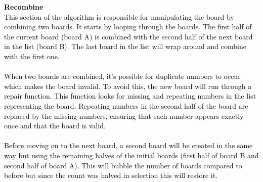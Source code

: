 \documentclass{scrartcl}
\begin{document}
\textcolor{black}{\textbf{Recombine \\} This section of the algorithm is responsible for manipulating the board by combining two boards. It starts by looping through the boards. The first half of the current board (board A) is combined with the second half of the next board in the list (board B). The last board in the list will wrap around and combine with the first one. \\ \\ When two boards are combined, it’s possible for duplicate numbers to occur which makes the board invalid. To avoid this, the new board will run through a repair function. This function looks for missing and repeating numbers in the list representing the board. Repeating numbers in the second half of the board are replaced by the missing numbers, ensuring that each number appears exactly once and that the board is valid. \\ \\ Before moving on to the next board, a second board will be created in the same way but using the remaining halves of the initial boards (first half of board B and second half of board A). This will bubble the number of boards compared to before but since the count was halved in selection this will restore it.}
\end{document}
